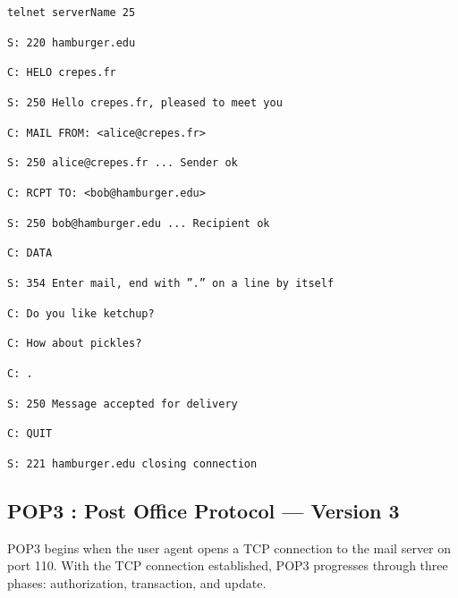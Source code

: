 \documentclass[11pt]{article}
\begin{document}
\texttt{telnet serverName 25}

\texttt{S: 220 hamburger.edu}

\texttt{C: HELO crepes.fr}

\texttt{S: 250 Hello crepes.fr, pleased to meet you}

\texttt{C: MAIL FROM: <alice@crepes.fr>}

\texttt{S: 250 alice@crepes.fr ... Sender ok}

\texttt{C: RCPT TO: <bob@hamburger.edu>}

\texttt{S: 250 bob@hamburger.edu ... Recipient ok}

\texttt{C: DATA}

\texttt{S: 354 Enter mail, end with ”.” on a line by itself}

\texttt{C: Do you like ketchup?}

\texttt{C: How about pickles?}

\texttt{C: .}

\texttt{S: 250 Message accepted for delivery}

\texttt{C: QUIT}

\texttt{S: 221 hamburger.edu closing connection}

\subsection{POP3 : Post Office Protocol --- Version 3}

POP3 begins when the user agent opens a TCP connection to the mail server on port 110. With the TCP connection established, POP3 progresses through three phases: authorization, transaction, and update. 
\end{document}
